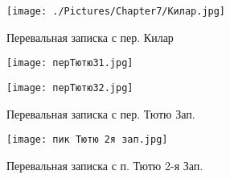     \begin{figure}[ht]\label{fig:pass_notes_kilar}
        \centering
        \texttt{[image: ./Pictures/Chapter7/Килар.jpg]}
        \caption{Перевальная записка с пер. Килар}
    \end{figure}

    \begin{figure}[ht]\label{fig:pass_notes_tutu}
        \begin{center}
            \begin{minipage}[h]{0.5\linewidth}
                \texttt{[image: перТютюЗ1.jpg]}
            \end{minipage}%
            \begin{minipage}[h]{0.5\linewidth}
                \texttt{[image: перТютюЗ2.jpg]}
            \end{minipage}
        \end{center}
        \caption{Перевальная записка с пер. Тютю Зап.}
    \end{figure}

    \begin{figure}[ht]\label{fig:pass_notes_tutu2}
        \centering
        \texttt{[image: пик Тютю 2я зап.jpg]}
        \caption{Перевальная записка с п. Тютю 2-я Зап.}
    \end{figure}
